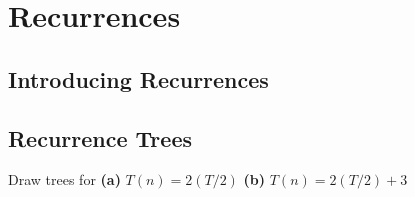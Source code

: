 
\chapter{Recurrences}


\section{Introducing Recurrences}




\section{Recurrence Trees}





\begin{example}
Draw trees for \textbf{(a)} $T(n) = 2(T/2)$ \textbf{(b)} $T(n) = 2(T/2) + 3$
\end{example}






